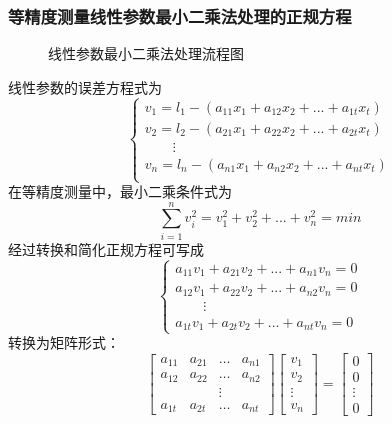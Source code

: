 \subsubsection{等精度测量线性参数最小二乘法处理的正规方程}
\begin{figure}[H]
	\centering
	\caption{线性参数最小二乘法处理流程图}
\end{figure}
线性参数的误差方程式为
\[ \begin{cases}
	v_1 = l_1-(a_{11}x_1+a_{12}x_2+...+a_{1t}x_t)\\
	v_2 = l_2-(a_{21}x_1+a_{22}x_2+...+a_{2t}x_t)\\
	\qquad \vdots\\
	v_n = l_n-(a_{n1}x_1+a_{n2}x_2+...+a_{nt}x_t)\\
\end{cases} \]
在等精度测量中，最小二乘条件式为\[ \sum_{i=1}^{n}v_i^2=v_1^2+v_2^2+...+v_n^2=min \]
经过转换和简化正规方程可写成
\[ \begin{cases}
	a_{11}v_1+a_{21}v_2+...+a_{n1}v_n=0\\
	a_{12}v_1+a_{22}v_2+...+a_{n2}v_n=0\\
	\qquad \vdots\\
	a_{1t}v_1+a_{2t}v_2+...+a_{nt}v_n=0
\end{cases} \]
转换为矩阵形式：
\[ \begin{bmatrix}
	a_{11}&a_{21}&\dots&a_{n1}\\
	a_{12}&a_{22}&\dots&a_{n2}\\
		  & 	 &\vdots\\
	a_{1t}&a_{2t}&\dots&a_{nt}
\end{bmatrix}\begin{bmatrix}
	v_1\\v_2\\\vdots\\v_n
\end{bmatrix}=\begin{bmatrix}
	0\\0\\\vdots\\0
\end{bmatrix} \]
